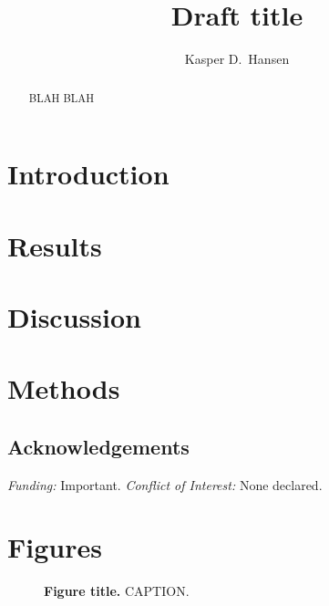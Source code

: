 \documentclass[pdftex,english,12pt]{article}
\begin{document}
\renewcommand\Affilfont{\small}

\title{Draft title}

\author[1,2,*]{Kasper D.\ Hansen}
\date{}

\maketitle

\let\oldthefootnote\thefootnote
\renewcommand{\thefootnote}{\fnsymbol{footnote}}
\let\thefootnote\oldthefootnote

\begin{abstract}
  \noindent 
  BLAH BLAH
\end{abstract}

\clearpage

\section*{Introduction}

\section*{Results}

\section*{Discussion}

\section*{Methods}

\subsection*{Acknowledgements}

\emph{Funding:} Important.
\emph{Conflict of Interest:} None declared.

\clearpage




\clearpage

\section*{Figures}

\begin{figure}[h!]
  \centering
  \caption{\textbf{Figure title.}  CAPTION.}
  \label{fig:example}
\end{figure}
\end{document}
